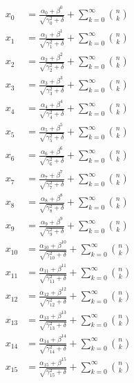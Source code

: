 \documentclass{article}
\begin{document}
\begin{align}
  x_{0} &= \frac{\alpha_{0} + \beta^{0}}{\sqrt{\gamma_{0}^2 + \delta}} + \sum_{k=0}^{\infty} \binom{n}{k} \label{eq:0} \\
  x_{1} &= \frac{\alpha_{1} + \beta^{1}}{\sqrt{\gamma_{1}^2 + \delta}} + \sum_{k=0}^{\infty} \binom{n}{k} \label{eq:1} \\
  x_{2} &= \frac{\alpha_{2} + \beta^{2}}{\sqrt{\gamma_{2}^2 + \delta}} + \sum_{k=0}^{\infty} \binom{n}{k} \label{eq:2} \\
  x_{3} &= \frac{\alpha_{3} + \beta^{3}}{\sqrt{\gamma_{3}^2 + \delta}} + \sum_{k=0}^{\infty} \binom{n}{k} \label{eq:3} \\
  x_{4} &= \frac{\alpha_{4} + \beta^{4}}{\sqrt{\gamma_{4}^2 + \delta}} + \sum_{k=0}^{\infty} \binom{n}{k} \label{eq:4} \\
  x_{5} &= \frac{\alpha_{5} + \beta^{5}}{\sqrt{\gamma_{5}^2 + \delta}} + \sum_{k=0}^{\infty} \binom{n}{k} \label{eq:5} \\
  x_{6} &= \frac{\alpha_{6} + \beta^{6}}{\sqrt{\gamma_{6}^2 + \delta}} + \sum_{k=0}^{\infty} \binom{n}{k} \label{eq:6} \\
  x_{7} &= \frac{\alpha_{7} + \beta^{7}}{\sqrt{\gamma_{7}^2 + \delta}} + \sum_{k=0}^{\infty} \binom{n}{k} \label{eq:7} \\
  x_{8} &= \frac{\alpha_{8} + \beta^{8}}{\sqrt{\gamma_{8}^2 + \delta}} + \sum_{k=0}^{\infty} \binom{n}{k} \label{eq:8} \\
  x_{9} &= \frac{\alpha_{9} + \beta^{9}}{\sqrt{\gamma_{9}^2 + \delta}} + \sum_{k=0}^{\infty} \binom{n}{k} \label{eq:9} \\
  x_{10} &= \frac{\alpha_{10} + \beta^{10}}{\sqrt{\gamma_{10}^2 + \delta}} + \sum_{k=0}^{\infty} \binom{n}{k} \label{eq:10} \\
  x_{11} &= \frac{\alpha_{11} + \beta^{11}}{\sqrt{\gamma_{11}^2 + \delta}} + \sum_{k=0}^{\infty} \binom{n}{k} \label{eq:11} \\
  x_{12} &= \frac{\alpha_{12} + \beta^{12}}{\sqrt{\gamma_{12}^2 + \delta}} + \sum_{k=0}^{\infty} \binom{n}{k} \label{eq:12} \\
  x_{13} &= \frac{\alpha_{13} + \beta^{13}}{\sqrt{\gamma_{13}^2 + \delta}} + \sum_{k=0}^{\infty} \binom{n}{k} \label{eq:13} \\
  x_{14} &= \frac{\alpha_{14} + \beta^{14}}{\sqrt{\gamma_{14}^2 + \delta}} + \sum_{k=0}^{\infty} \binom{n}{k} \label{eq:14} \\
  x_{15} &= \frac{\alpha_{15} + \beta^{15}}{\sqrt{\gamma_{15}^2 + \delta}} + \sum_{k=0}^{\infty} \binom{n}{k} \label{eq:15} \\

\end{align}
\end{document}
